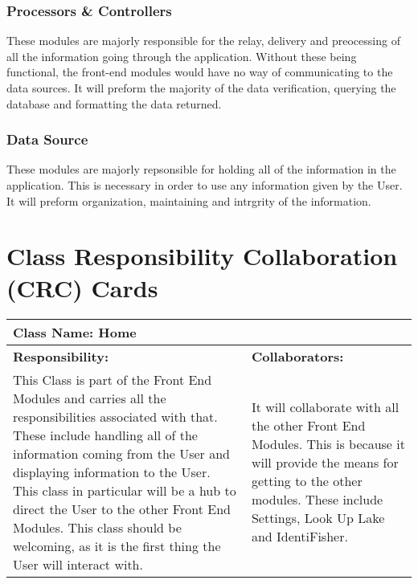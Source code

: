 \documentclass[]{article}
\begin{document}
\subsubsection{Processors \& Controllers}
These modules are majorly responsible for the relay, delivery and preocessing of all the information going through the application. Without these being functional, the front-end modules would have no way of communicating to the data sources. It will preform the majority of the data verification, querying the database and formatting the data returned.
\subsubsection{Data Source}
These modules are majorly repsonsible for holding all of the information in the application. This is necessary in order to use any information given by the User. It will preform organization, maintaining and intrgrity of the information. 
	
\newpage	
\section{Class Responsibility Collaboration (CRC) Cards}
\label{sec:class_responsibility_collaboration_crc_cards}

	\begin{table}[ht]
		\centering
		\begin{tabular}{|p{5cm}|p{5cm}|}
		\hline 
		 \multicolumn{2}{|l|}{\textbf{Class Name: Home}} \\
		\hline
		\textbf{Responsibility:} & \textbf{Collaborators:} \\ \hline
		 This Class is part of the Front End Modules and carries all the responsibilities associated with that. These include handling all of the information coming from the User and displaying information to the User. This class in particular will be a hub to direct the User to the other Front End Modules. This class should be welcoming, as it is the first thing the User will interact with.& It will collaborate with all the other Front End Modules. This is because it will provide the means for getting to the other modules. These include Settings, Look Up Lake and IdentiFisher. \\
		\hline
		\end{tabular}
	\end{table}~\\
\end{document}
